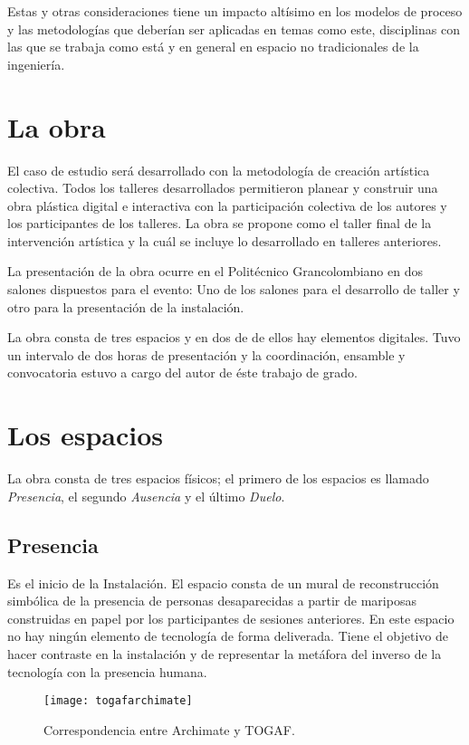 Estas y otras consideraciones tiene un impacto altísimo en los modelos de proceso y las metodologías que deberían ser aplicadas en temas como este, disciplinas con las que se trabaja como está y en general en espacio no tradicionales de la ingeniería.  

\section{La obra}

El caso de estudio será desarrollado con la metodología de creación artística colectiva. Todos los talleres desarrollados permitieron planear y construir una obra plástica digital e interactiva con la participación colectiva de los autores y los participantes de los talleres. La obra se propone como el taller final de la intervención artística y la cuál se incluye lo desarrollado en talleres anteriores.

La presentación de la obra ocurre en el Politécnico Grancolombiano en dos salones dispuestos para el evento: Uno de los salones para el desarrollo de taller y otro para la presentación de la instalación.

La obra consta de tres espacios y en dos de de ellos hay elementos digitales. Tuvo un intervalo de dos horas de presentación y la coordinación, ensamble y convocatoria estuvo a cargo del autor de éste trabajo de grado.

\section{Los espacios}

La obra consta de tres espacios físicos; el primero de los espacios es llamado \textit{Presencia}, el segundo \textit{Ausencia} y el último \textit{Duelo}.

\subsection{Presencia}

Es el inicio de la Instalación. El espacio consta de un mural de reconstrucción simbólica de la presencia de personas desaparecidas a partir de mariposas construidas en papel por los participantes de sesiones anteriores. En este espacio no hay ningún elemento de tecnología de forma deliverada. Tiene el objetivo de hacer contraste en la instalación y de representar la metáfora del inverso de la tecnología con la presencia humana. 

\begin{figure}[h]\label{togafarchimate}
\centering
\texttt{[image: togafarchimate]}
\caption{Correspondencia entre Archimate y TOGAF.}
\end{figure}



